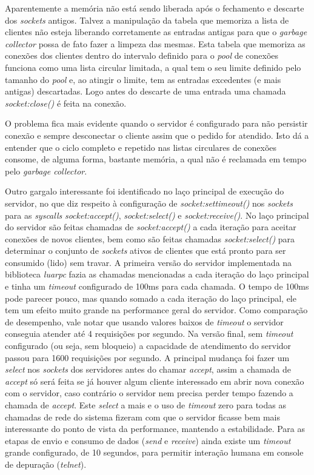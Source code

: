 \documentclass[11pt]{article}
\begin{document}
Aparentemente a memória não está sendo liberada após o fechamento e descarte dos
\textit{sockets} antigos. Talvez a manipulação da tabela que memoriza a lista de
clientes não esteja liberando corretamente as entradas antigas para que o
\textit{garbage collector} possa de fato fazer a limpeza das mesmas.  Esta
tabela que memoriza as conexões dos clientes dentro do intervalo definido para o
\textit{pool} de conexões funciona como uma lista circular limitada, a qual tem
o seu limite definido pelo tamanho do \textit{pool} e, ao atingir o limite, tem
as entradas excedentes (e mais antigas) descartadas. Logo antes do descarte de
uma entrada uma chamada \textit{socket:close()} é feita na conexão.

O problema fica mais evidente quando o servidor é configurado para não persistir
conexão e sempre desconectar o cliente assim que o pedido for atendido. Isto dá
a entender que o ciclo completo e repetido nas listas circulares de conexões
consome, de alguma forma, bastante memória, a qual não é reclamada em tempo pelo
\textit{garbage collector}.

Outro gargalo interessante foi identificado no laço principal de execução do
servidor, no que diz respeito à configuração de \textit{socket:settimeout()} nos
\textit{sockets} para as \textit{syscalls} \textit{socket:accept()},
\textit{socket:select()} e \textit{socket:receive()}. No laço principal do
servidor são feitas chamadas de \textit{socket:accept()} a cada iteração para
aceitar conexões de novos clientes, bem como são feitas chamadas
\textit{socket:select()} para determinar o conjunto de \textit{sockets} ativos
de clientes que está pronto para ser consumido (lido) sem travar. A primeira
versão do servidor implementada na biblioteca \textit{luarpc} fazia as chamadas
mencionadas a cada iteração do laço principal e tinha um \textit{timeout}
configurado de 100ms para cada chamada. O tempo de 100ms pode parecer pouco, mas
quando somado a cada iteração do laço principal, ele tem um efeito muito grande
na performance geral do servidor. Como comparação de desempenho, vale notar que
usando valores baixos de \textit{timeout} o servidor conseguia atender até 4
requisições por segundo. Na versão final, sem \textit{timeout} configurado (ou
seja, sem bloqueio) a capacidade de atendimento do servidor passou para 1600
requisições por segundo. A principal mudança foi fazer um \textit{select} nos
\textit{sockets} dos servidores antes do chamar \textit{accept}, assim a chamada
de \textit{accept} só será feita se já houver algum cliente interessado em abrir
nova conexão com o servidor, caso contrário o servidor nem precisa perder tempo
fazendo a chamada de \textit{accept}. Este \textit{select} a mais e o uso de
\textit{timeout} zero para todas as chamadas de rede do sistema fizeram com que
o servidor ficasse bem mais interessante do ponto de vista da performance,
mantendo a estabilidade. Para as etapas de envio e consumo de dados
(\textit{send} e \textit{receive}) ainda existe um \textit{timeout} grande
configurado, de 10 segundos, para permitir interação humana em console de
depuração (\textit{telnet}).
\end{document}
